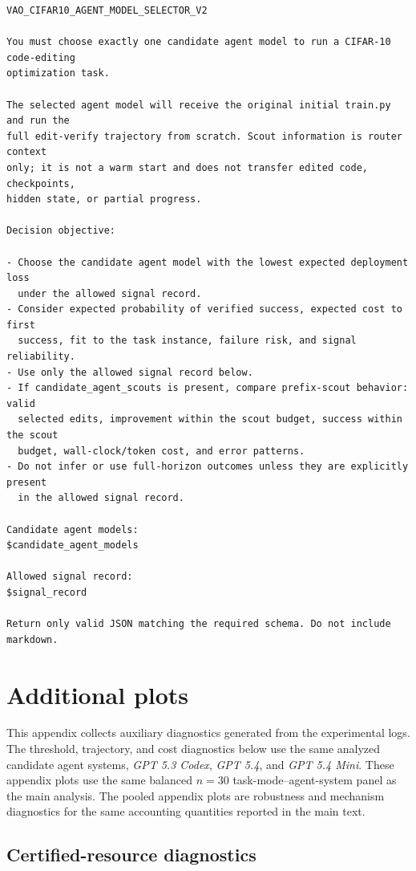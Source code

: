 \documentclass{article}
\begin{document}
\begingroup
\footnotesize
\begin{verbatim}
VAO_CIFAR10_AGENT_MODEL_SELECTOR_V2

You must choose exactly one candidate agent model to run a CIFAR-10 code-editing
optimization task.

The selected agent model will receive the original initial train.py and run the
full edit-verify trajectory from scratch. Scout information is router context
only; it is not a warm start and does not transfer edited code, checkpoints,
hidden state, or partial progress.

Decision objective:

- Choose the candidate agent model with the lowest expected deployment loss
  under the allowed signal record.
- Consider expected probability of verified success, expected cost to first
  success, fit to the task instance, failure risk, and signal reliability.
- Use only the allowed signal record below.
- If candidate_agent_scouts is present, compare prefix-scout behavior: valid
  selected edits, improvement within the scout budget, success within the scout
  budget, wall-clock/token cost, and error patterns.
- Do not infer or use full-horizon outcomes unless they are explicitly present
  in the allowed signal record.

Candidate agent models:
$candidate_agent_models

Allowed signal record:
$signal_record

Return only valid JSON matching the required schema. Do not include markdown.
\end{verbatim}
\endgroup

\section{Additional plots}
\label{app:diagnostic-plots}

This appendix collects auxiliary diagnostics generated from the experimental logs.
The threshold, trajectory, and cost diagnostics below use the same analyzed candidate agent systems, \textit{GPT 5.3 Codex}, \textit{GPT 5.4}, and \textit{GPT 5.4 Mini}.
These appendix plots use the same balanced \(n=30\) task-mode--agent-system panel as the main analysis.
The pooled appendix plots are robustness and mechanism diagnostics for the same accounting quantities reported in the main text.

\subsection{Certified-resource diagnostics}
\label{app:certified-resource-diagnostics}
\end{document}
